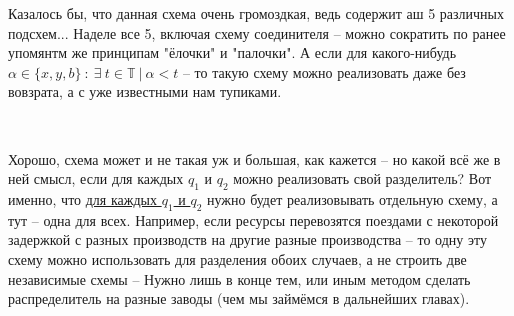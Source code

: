 







\vspace{0.5in}

Казалось бы, что данная схема очень громоздкая, ведь содержит аш 5 различных подсхем... Наделе все 5, включая схему соединителя -- можно сократить по ранее упомянтм же принципам "ёлочки" и "палочки". А если для какого-нибудь $\alpha \in \{ x, y, b \} \ : \ \exists \ t \in \mathbb{T} \ | \ \alpha < t$ -- то такую схему можно реализовать даже без вовзрата, а с уже известными нам тупиками.

\

Хорошо, схема может и не такая уж и большая, как кажется -- но какой всё же в ней смысл, если для каждых $q_1$ и $q_2$ можно реализовать свой разделитель? Вот именно, что \underline{для каждых $q_1$ и $q_2$} нужно будет реализовывать отдельную схему, а тут -- одна для всех. Например, если ресурсы перевозятся поездами с некоторой задержкой с разных производств на другие разные производства -- то одну эту схему можно использовать для разделения обоих случаев, а не строить две независимые схемы -- Нужно лишь в конце тем, или иным методом сделать распределитель на разные заводы (чем мы займёмся в дальнейших главах).











